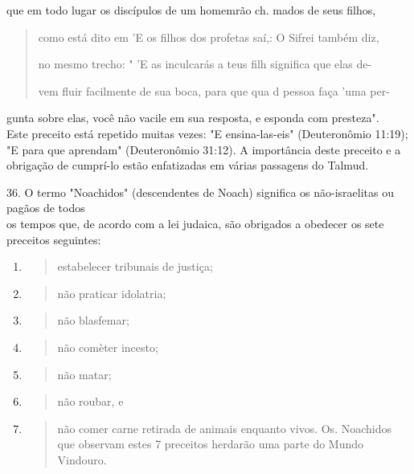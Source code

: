 que em todo lugar os discípulos de um homemrão ch. mados de seus filhos,

\begin{quote}
como está dito em 'E os filhos dos profetas saí,: O Sifrei também diz,

no mesmo trecho: " 'E as inculcarás a teus filh significa que elas de-

vem fluir facilmente de sua boca, para que qua d pessoa faça 'uma per-
\end{quote}

gunta sobre elas, você não vacile em sua resposta, e esponda com
presteza".\\
Este preceito está repetido muitas vezes: "E ensina-las-eis"
(Deuteronômio
11:19); "E para que aprendam" (Deuteronômio 31:12). A importância
deste preceito
e a obrigação de cumprí-lo estão enfatizadas em várias passagens
do Talmud.

36. O termo "Noachidos" (descendentes de Noach) significa os
não-israelitas ou pagãos de todos\\
os tempos que, de acordo com a lei judaica, são obrigados a obedecer os
sete preceitos seguintes:

\begin{enumerate}
\def\labelenumi{(\arabic{enumi})}
\item
 \begin{quote}
 estabelecer tribunais de justiça;
 \end{quote}
\item
 \begin{quote}
 não praticar idolatria;
 \end{quote}
\item
 \begin{quote}
 não blasfemar;
 \end{quote}
\item
 \begin{quote}
 não comèter incesto;
 \end{quote}
\item
 \begin{quote}
 não matar;
 \end{quote}
\item
 \begin{quote}
 não roubar, e
 \end{quote}
\item
 \begin{quote}
 não comer carne retirada de animais enquanto vivos. Os. Noachidos que
 obser­vam estes 7 preceitos herdarão uma parte do Mundo Vindouro.
 \end{quote}
\end{enumerate}

